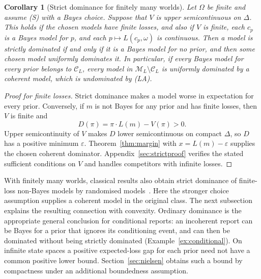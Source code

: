 \documentclass[11pt]{article}
\newtheorem{corollary}[theorem]{Corollary}
\theoremstyle{definition}
\theoremstyle{remark}
\newcommand{\M}{\mathcal M}
\newcommand{\C}{\mathcal C}
\begin{document}
\begin{corollary}[Strict dominance for finitely many worlds]\label{cor:strict}
Let $\Omega$ be finite and assume (S) with a Bayes choice. Suppose that $V$ is upper semicontinuous on $\Delta$. This holds if the chosen models have finite losses, and also if $V$ is finite, each $c_p$ is a Bayes model for $p$, and each $p\mapsto L(c_p,\omega)$ is continuous. Then a model is strictly dominated if and only if it is a Bayes model for no prior, and then some chosen model uniformly dominates it. In particular, if every Bayes model for every prior belongs to $\C_L$, every model in $\M_L\setminus\C_L$ is uniformly dominated by a coherent model, which is undominated by (LA).
\end{corollary}
\begin{proof}[Proof for finite losses]
Strict dominance makes a model worse in expectation for every prior. Conversely, if $m$ is not Bayes for any prior and has finite losses, then $V$ is finite and
\[
 D(\pi)=\pi\cdot L(m)-V(\pi)>0.
\]
Upper semicontinuity of $V$ makes $D$ lower semicontinuous on compact $\Delta$, so $D$ has a positive minimum $\varepsilon$. Theorem~\ref{thm:margin} with $x=L(m)-\varepsilon$ supplies the chosen coherent dominator. Appendix~\ref{sec:strictproof} verifies the stated sufficient conditions on $V$ and handles competitors with infinite losses.
\end{proof}
With finitely many worlds, classical results also obtain strict dominance of finite-loss non-Bayes models by randomised models~\cite[Theorem~7]{SSK09}. Here the stronger choice assumption supplies a coherent model in the original class. The next subsection explains the resulting connection with convexity. Ordinary dominance is the appropriate general conclusion for conditional reports: an incoherent report can be Bayes for a prior that ignores its conditioning event, and can then be dominated without being strictly dominated (Example~\ref{ex:conditional}). On infinite state spaces a positive expected-loss gap for each prior need not have a common positive lower bound. Section~\ref{sec:nielsen} obtains such a bound by compactness under an additional boundedness assumption.
\end{document}
